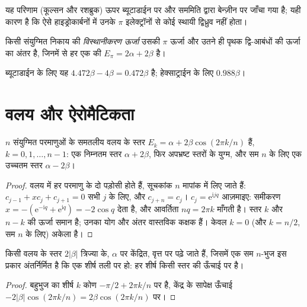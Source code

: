\admitted

यह परिणाम (कूल्सन और रशब्रुक) ऊपर ब्यूटाडाईन पर और सममिति द्वारा बेन्ज़ीन पर
जाँचा गया है; यही कारण है कि ऐसे हाइड्रोकार्बनों में उनके
$\pi$ इलेक्ट्रॉनों से कोई स्थायी द्विध्रुव नहीं होता।

\begin{definition}[विस्थानीकरण ऊर्जा]\label{def:b2:huckel:delocalisation}
किसी संयुग्मित निकाय की \emph{विस्थानीकरण ऊर्जा}
उसकी $\pi$ ऊर्जा और उतने ही
पृथक द्वि-आबंधों की ऊर्जा का अंतर है, जिनमें से हर एक की $E_\pi = 2\alpha + 2\beta$ है।
\end{definition}

ब्यूटाडाईन के लिए यह $4.472\beta - 4\beta = 0.472\beta$ है; हेक्साट्राईन के लिए $0.988\beta$।

\section{वलय और ऐरोमैटिकता}

\begin{theorem}[वलय के स्तर]\label{thm:b2:huckel:ring}
$n$ संयुग्मित परमाणुओं के समतलीय वलय के स्तर $E_k = \alpha + 2\beta\cos(2\pi k/n)$ हैं,
$k = 0, 1, \dots, n - 1$: एक निम्नतम स्तर $\alpha + 2\beta$, फिर अपभ्रष्ट स्तरों के
युग्म, और सम $n$ के लिए एक उच्चतम स्तर $\alpha - 2\beta$।
\end{theorem}

\begin{proof}
वलय में हर परमाणु के दो पड़ोसी होते हैं, सूचकांक $n$ मापांक में लिए जाते हैं:
$c_{j-1} + xc_j + c_{j+1} = 0$ सभी $j$ के लिए, और $c_{j+n} = c_j$। $c_j = \mathrm e^{\mathrm
i jq}$ आज़माइए: समीकरण $x = -(\mathrm e^{-\mathrm iq} + \mathrm e^{\mathrm iq}) = -2\cos q$ देता है,
और आवर्तिता $nq = 2\pi k$ माँगती है। स्तर $k$ और $n - k$ की ऊर्जा समान
है; उनका योग और अंतर वास्तविक कक्षक हैं। केवल $k = 0$ (और $k = n/2$, सम $n$ के लिए)
अकेला है।
\end{proof}

\begin{corollary}[फ़्रॉस्ट वृत्त]\label{cor:b2:huckel:frost}
किसी वलय के स्तर $2|\beta|$ त्रिज्या के, $\alpha$ पर केंद्रित, वृत्त पर पढ़े जाते हैं, जिसमें
एक सम $n$-भुज इस प्रकार अंतर्निर्मित है कि एक शीर्ष तली पर हो: हर शीर्ष
किसी स्तर की ऊँचाई पर है।
\end{corollary}

\begin{proof}
बहुभुज का शीर्ष $k$ कोण $-\pi/2 + 2\pi k/n$ पर है, केंद्र के सापेक्ष ऊँचाई
$-2|\beta|\cos(2\pi k/n) = 2\beta\cos(2\pi k/n)$ पर।
\end{proof}

